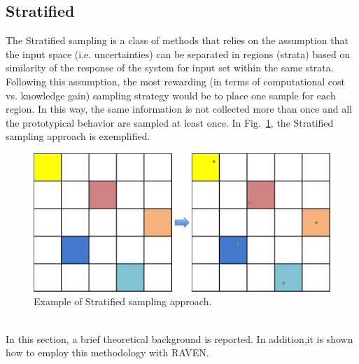 \subsection{Stratified}
\label{sub:Stratified}
The Stratified sampling is a class of methods that relies on the assumption that the input space (i.e. uncertainties) 
can be separated in regions (strata) based on similarity of the response of the system for input set within the
same strata. Following this assumption, the most rewarding (in terms of computational cost vs. knowledge gain) 
sampling strategy would be to place one sample for each region. In this way, the same information is not 
collected more than once and all the prototypical behavior are sampled at least once. In 
Fig.~\ref{fig:StratifiedSamplingExample}, the Stratified sampling approach is exemplified. 
 \begin{figure}[h!]
  \centering
  \includegraphics[scale=0.55]{pics/StratifiedSamplingExample.png}
  \caption{Example of Stratified sampling approach.}
  \label{fig:StratifiedSamplingExample}
 \end{figure}
\\In this section, a brief theoretical 
background is reported. In addition,it is shown how to employ this methodology with RAVEN.
